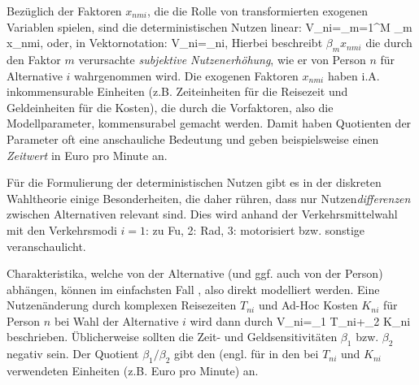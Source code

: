 Bez\"uglich der
Faktoren $x_{nmi}$, 
 die die
Rolle von transformierten exogenen Variablen spielen, sind die
deterministischen Nutzen linear:
\be
\label{Vquasilin}
V_{ni}=\sum\limits_{m=1}^M \beta_m x_{nmi},
\ee
oder, in Vektornotation:
\be
\label{VquasilinVec}
V_{ni}=\vecbeta\tr {}_{ni},
\ee
%
Hierbei beschreibt $\beta_m x_{nmi}$ die durch den Faktor $m$
verursachte \textit{subjektive Nutzenerh\"ohung}, wie er von Person
$n$ f\"ur Alternative $i$ wahrgenommen wird. 
Die exogenen Faktoren $x_{nmi}$ haben
i.A. inkommensurable Einheiten (z.B. Zeiteinheiten f\"ur die Reisezeit
und Geldeinheiten f\"ur die Kosten), die durch die Vorfaktoren,
also die Modellparameter, kommensurabel gemacht werden. Damit haben
Quotienten der Parameter oft eine anschauliche Bedeutung und geben
beispielsweise einen \emph{Zeitwert} in Euro pro Minute an.

F\"ur die Formulierung der deterministischen Nutzen gibt es in der
diskreten Wahltheorie einige Besonderheiten, die daher r\"uhren, dass
nur Nutzen\emph{differenzen} zwischen Alternativen relevant sind. Dies
wird anhand der Verkehrsmittelwahl mit den Verkehrsmodi $i=1$: zu
Fu\3, 2: Rad, 3: motorisiert bzw. sonstige veranschaulicht.

\bi
\item Charakteristika, welche von der Alternative (und ggf. auch von
  der Person) abh\"angen, k\"onnen im einfachsten Fall
  , also direkt
  modelliert werden.  Eine Nutzen\-\"anderung durch komplexen Reisezeiten $T_{ni}$
  und Ad-Hoc Kosten $K_{ni}$ f\"ur Person $n$ bei Wahl der Alternative
  $i$ wird dann durch
\be
\label{VkiBeispielGen}
\Delta V_{ni}=\beta_1 T_{ni}+\beta_2 K_{ni}
\ee
beschrieben. \"Ublicherweise sollten die Zeit- und Geldsensitivit\"aten $\beta_1$
bzw. $\beta_2$ negativ sein. Der Quotient $\beta_1/\beta_2$ gibt den
 (engl.  f\"ur  in den bei $T_{ni}$ und $K_{ni}$ verwendeten
Einheiten (z.B. Euro pro Minute) an.


